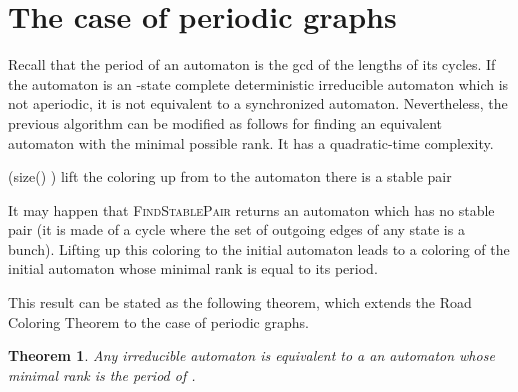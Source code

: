 \documentclass[11pt,a4paper]{article}
\newtheorem{theorem}{Theorem}
\begin{document}
\section{The case of periodic graphs} \label{section.periodic}

Recall that the period of an automaton is the gcd of the lengths of
its cycles.  If the automaton  is an -state
complete deterministic irreducible automaton which is not aperiodic,
it is not equivalent to a synchronized automaton. Nevertheless, the
previous algorithm can be modified as follows for finding an equivalent
automaton with the minimal possible rank. It has a quadratic-time
complexity.

\begin{small}
\begin{codebox}
\Procname{}
\li  
\li  \While (size() ) 
\li      \Do {}
\li        {}
\label{li:PeriodicFindColoring-3}
\li       lift the coloring up from  to the automaton  
\li       \If there is a stable pair  
\label{li:PeriodicFindColoring-4}
\li              \Then  {}
\li              \Else \Return 
          \End
     \End
\li \Return  
\end{codebox}
\end{small}
It may happen that \textsc{FindStablePair} returns an automaton 
which has no stable pair (it is made of a cycle where the set of
outgoing edges of any state is a bunch).  Lifting up this coloring
to the initial automaton  leads to a coloring of the initial
automaton whose minimal rank is equal to its period.

This result can be stated as the following theorem, which extends the Road
Coloring Theorem to the case of periodic graphs.


\begin{theorem}
  Any irreducible automaton  is equivalent to a an automaton whose
  minimal rank is the period of .
\end{theorem}
 
\end{document}
